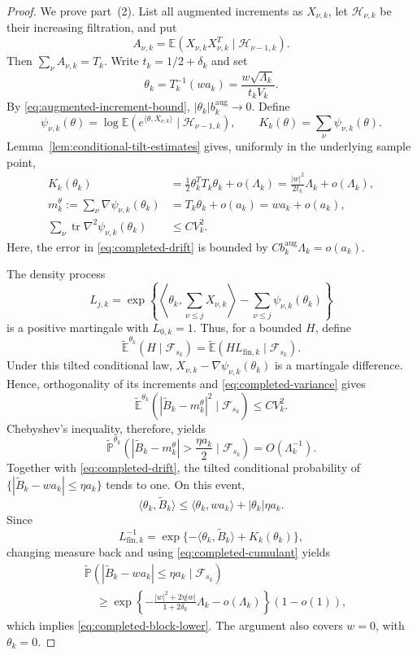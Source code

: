 \documentclass[10pt,a4paper]{amsart}
\DeclareMathOperator{\tr}{tr}
\newcommand{\E}{\mathbb E}
\begin{document}
\begin{proof}
We prove part~(2). List all augmented increments as $X_{\nu,k}$, let
$\mathcal H_{\nu,k}$ be their increasing filtration, and put
\[
 A_{\nu,k}=\E(X_{\nu,k}X_{\nu,k}^T\mid\mathcal H_{\nu-1,k}).
\]
Then $\sum_\nu A_{\nu,k}=T_k$. Write
$t_k=1/2+\delta_k$ and set
\[
 \theta_k=T_k^{-1}(wa_k)=\frac{w\sqrt{\Lambda_k}}{t_kV_k}.
\]
By \eqref{eq:augmented-increment-bound},
$|\theta_k|b_k^{\mathrm{aug}}\to0$. Define
\[
 \psi_{\nu,k}(\theta)=
 \log\E(e^{\langle\theta,X_{\nu,k}\rangle}
       \mid\mathcal H_{\nu-1,k}),
 \qquad
 K_k(\theta)=\sum_\nu\psi_{\nu,k}(\theta).
\]
Lemma~\ref{lem:conditional-tilt-estimates} gives, uniformly in the underlying
sample point,
\begin{align}
 K_k(\theta_k)
 &=\frac12\theta_k^TT_k\theta_k+o(\Lambda_k)
 =\frac{|w|^2}{2t_k}\Lambda_k+o(\Lambda_k),
 \label{eq:completed-cumulant}\\
 m_k^{\theta}:=\sum_\nu\nabla\psi_{\nu,k}(\theta_k)
 &=T_k\theta_k+o(a_k)=wa_k+o(a_k),
 \label{eq:completed-drift}\\
 \sum_\nu\tr\nabla^2\psi_{\nu,k}(\theta_k)&\le CV_k^2.
 \label{eq:completed-variance}
\end{align}
Here, the error in \eqref{eq:completed-drift} is bounded by
$Cb_k^{\mathrm{aug}}\Lambda_k=o(a_k)$.

The density process
\[
 L_{j,k}=\exp\left\{
 \left\langle\theta_k,\sum_{\nu\le j}X_{\nu,k}\right\rangle
 -\sum_{\nu\le j}\psi_{\nu,k}(\theta_k)
 \right\}
\]
is a positive martingale with $L_{0,k}=1$. Thus, for a bounded $H$, define
\[
 \widetilde{\mathbb E}^{\theta_k}
 (H\mid\mathcal F_{s_k})
 =\widetilde{\mathbb E}(HL_{\mathrm{fin},k}
   \mid\mathcal F_{s_k}).
\]
Under this tilted conditional law,
$X_{\nu,k}-\nabla\psi_{\nu,k}(\theta_k)$ is a martingale difference. Hence,
orthogonality of its increments and \eqref{eq:completed-variance} gives
\[
 \widetilde{\mathbb E}^{\theta_k}\left(
 \left|\widetilde B_k-m_k^{\theta}\right|^2
 \mid\mathcal F_{s_k}\right)\le CV_k^2.
\]
Chebyshev's inequality, therefore, yields
\[
 \widetilde{\mathbb P}^{\theta_k}\left(
 |\widetilde B_k-m_k^{\theta}|>\frac{\eta a_k}{2}
 \mid\mathcal F_{s_k}\right)=O(\Lambda_k^{-1}).
\]
Together with \eqref{eq:completed-drift}, the tilted conditional probability
of $\{|\widetilde B_k-wa_k|\le\eta a_k\}$ tends to one. On this event,
\[
 \langle\theta_k,\widetilde B_k\rangle
 \le\langle\theta_k,wa_k\rangle+|\theta_k|\eta a_k.
\]
Since
\[
 L_{\mathrm{fin},k}^{-1}
 =\exp\{-\langle\theta_k,\widetilde B_k\rangle
          +K_k(\theta_k)\},
\]
changing measure back and using \eqref{eq:completed-cumulant} yields
\begin{align*}
 &\widetilde{\mathbb P}\left(
 |\widetilde B_k-wa_k|\le\eta a_k\mid\mathcal F_{s_k}\right)\\
 &\quad\ge
 \exp\left\{-\frac{|w|^2+2\eta|w|}{1+2\delta_k}\Lambda_k
              -o(\Lambda_k)\right\}(1-o(1)),
\end{align*}
which implies \eqref{eq:completed-block-lower}. The argument also covers
$w=0$, with $\theta_k=0$.


\end{proof}
\end{document}
